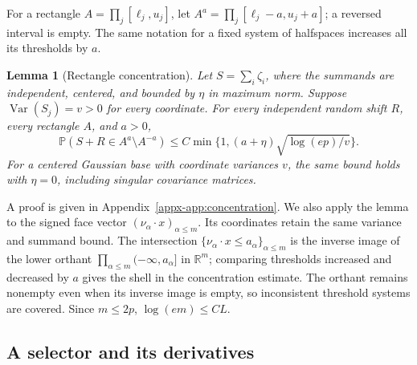 \documentclass[11pt,letterpaper]{article}
\newtheorem{lemma}{Lemma}
\theoremstyle{remark}
\newcommand{\Pp}{\mathbb P}
\newcommand{\R}{\mathbb R}
\newcommand{\Var}{\operatorname{Var}}
\begin{document}
For a rectangle \(A=\prod_j[\ell_j,u_j]\), let
\(A^a=\prod_j[\ell_j-a,u_j+a]\); a reversed interval is empty.
The same notation for a fixed system of halfspaces increases all its
thresholds by \(a\).

\begin{lemma}[Rectangle concentration]\label{appx-lem:concentration}
Let \(S=\sum_i\zeta_i\), where the summands are independent, centered,
and bounded by \(\eta\) in maximum norm. Suppose
\(\Var(S_j)=v>0\) for every coordinate. For every independent random
shift \(R\), every rectangle \(A\), and \(a>0\),
\begin{equation}
 \Pp(S+R\in A^a\setminus A^{-a})
 \le C\min\{1,(a+\eta)\sqrt{\log(ep)/v}\}.
 \label{appx-eq:concentration}
\end{equation}
For a centered Gaussian base with coordinate variances \(v\), the same
bound holds with \(\eta=0\), including singular covariance matrices.
\end{lemma}

A proof is given in Appendix~\ref{appx-app:concentration}.
We also apply the lemma to the signed face vector
\((\nu_\alpha\cdot x)_{\alpha\le m}\). Its coordinates retain
the same variance and summand bound. The intersection
\(\{\nu_\alpha\cdot x\le a_\alpha\}_{\alpha\le m}\) is the inverse
image of the lower orthant \(\prod_{\alpha\le m}(-\infty,a_\alpha]\)
in \(\R^m\); comparing thresholds increased and decreased by \(a\)
gives the shell in the concentration estimate. The orthant remains nonempty even when
its inverse image is empty, so inconsistent threshold systems are
covered. Since \(m\le2p\), \(\log(em)\le CL\).

\subsection{A selector and its derivatives}
\end{document}
